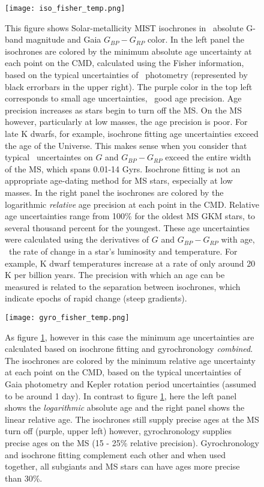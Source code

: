 \begin{figure}
  \caption{
    This figure shows Solar-metallicity MIST isochrones in \Gaia\ absolute
    G-band magnitude and Gaia $G_{BP} - G_{RP}$ color.
    In the left panel the isochrones are colored by the minimum absolute age
    uncertainty at each point on the CMD, calculated using the Fisher
    information, based on the typical uncertainties of \Gaia\ photometry
    (represented by black errorbars in the upper right).
    The purple color in the top left corresponds to small age uncertainties,
    \ie\ good age precision.
    Age precision increases as stars begin to turn off the MS.
    On the MS however, particularly at low masses, the age precision is poor.
    For late K dwarfs, for example, isochrone fitting age uncertainties exceed
    the age of the Universe.
    This makes sense when you consider that typical \Gaia\ uncertaintes on $G$
    and $G_{BP} - G_{RP}$ exceed the entire width of the MS, which spans
    0.01-14 Gyrs.
    Isochrone fitting is not an appropriate age-dating method for MS stars,
    especially at low masses.
    In the right panel the isochrones are colored by the logarithmic
    {\it relative} age precision at each point in the CMD.
    Relative age uncertainties range from 100\% for the oldest MS GKM stars,
    to several thousand percent for the youngest.
    These age uncertainties were calculated using the derivatives of $G$ and
    $G_{BP} - G_{RP}$ with age, \ie\ the rate of change in a star's luminosity
    and temperature.
    For example, K dwarf temperatures increase at a rate of only around 20 K
    per billion years.
    The precision with which an age can be measured is related to the
    separation between isochrones, which indicate epochs of rapid change
    (steep gradients).\label{fig:fischer_iso}
}
  \centering
    \texttt{[image: iso\_fisher\_temp.png]}
\label{fig:iso_fisher}
\end{figure}

\begin{figure}
  \caption{
    As figure \ref{fig:iso_fisher}, however in this case the minimum age
    uncertainties are calculated based on isochrone fitting and gyrochronology
    {\it combined}.
    The isochrones are colored by the minimum relative age uncertainty at each
    point on the CMD, based on the typical uncertainties of Gaia photometry
    and Kepler rotation period uncertainties (assumed to be around 1 day).
    In contrast to figure \ref{fig:iso_fisher}, here the left panel shows the
    {\it logarithmic} absolute age and the right panel shows the linear
    relative age.
    The isochrones still supply precise ages at the MS turn off (purple, upper
    left) however, gyrochronology supplies precise ages on the MS (15 - 25\%
    relative precision).
    Gyrochronology and isochrone fitting complement each other and when used
    together, all subgiants and MS stars can have ages more precise than 30\%.
    \label{fig:fischer_gyro}
}
  \centering
    \texttt{[image: gyro\_fisher\_temp.png]}
\label{fig:gyro_fisher}
\end{figure}

